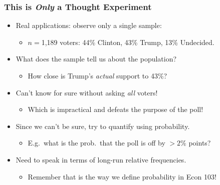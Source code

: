 \documentclass{beamer}
\begin{document}
\begin{frame}
  \frametitle{This is \emph{Only} a Thought Experiment}
  \begin{itemize}
    \item Real applications: observe only a \alert{single} sample:
      \begin{itemize}
        \item $n = $1,189 voters: 44\% Clinton, 43\% Trump, 13\% Undecided.
      \end{itemize}
      \pause
    \item What does the sample tell us about the population?
      \begin{itemize}
        \item How close is Trump's \emph{actual} support to 43\%?
      \end{itemize}
      \pause
    \item Can't know for sure without asking \emph{all} voters! 
      \begin{itemize}
        \item Which is impractical and defeats the purpose of the poll!
      \end{itemize}
      \pause
    \item Since we can't be sure, try to \alert{quantify} using \alert{probability}. 
      \begin{itemize}
        \item E.g.\ what is the prob.\ that the poll is off by $>2$\% points?
      \end{itemize}
      \pause
    \item Need to speak in terms of long-run relative frequencies.
      \begin{itemize}
        \item Remember that is the way we define probability in Econ 103!
      \end{itemize}
  \end{itemize}

\end{frame}
%
\end{document}
